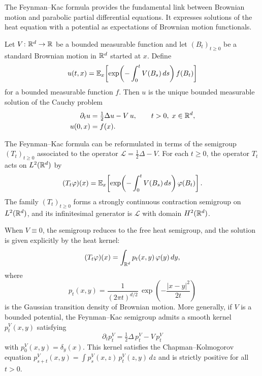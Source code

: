 The Feynman--Kac formula provides the fundamental link between Brownian motion and parabolic partial differential equations. It expresses solutions of the heat equation with a potential as expectations of Brownian motion functionals.

\begin{theorem}
Let $V \colon \mathbb{R}^d \to \mathbb{R}$ be a bounded measurable function and let $(B_t)_{t \geq 0}$ be a standard Brownian motion in $\mathbb{R}^d$ started at $x$. Define
\[
    u(t,x) = \operatorname{\mathbb{E}}_x\!\left[\exp\!\left(-\int_0^t V(B_s)\,ds\right) f(B_t)\right]
\]
for a bounded measurable function $f$. Then $u$ is the unique bounded measurable solution of the Cauchy problem
\begin{align}
    \partial_t u &= \tfrac{1}{2}\Delta u - V\, u, \qquad t > 0,\; x \in \mathbb{R}^d, \label{eq:feynman-kac-pde}\\
    u(0,x) &= f(x). \label{eq:feynman-kac-ic}
\end{align}
\end{theorem}

\begin{remark}
The Feynman--Kac formula can be reformulated in terms of the semigroup $(T_t)_{t \geq 0}$ associated to the operator $\mathcal{L} = \frac{1}{2}\Delta - V$. For each $t \geq 0$, the operator $T_t$ acts on $L^2(\mathbb{R}^d)$ by
\[
    (T_t \varphi)(x) = \operatorname{\mathbb{E}}_x\!\left[\exp\!\left(-\int_0^t V(B_s)\,ds\right) \varphi(B_t)\right].
\]
The family $(T_t)_{t \geq 0}$ forms a strongly continuous contraction semigroup on $L^2(\mathbb{R}^d)$, and its infinitesimal generator is $\mathcal{L}$ with domain $H^2(\mathbb{R}^d)$.
\end{remark}

\begin{remark}
When $V \equiv 0$, the semigroup reduces to the free heat semigroup, and the solution is given explicitly by the heat kernel:
\[
    (T_t \varphi)(x) = \int_{\mathbb{R}^d} p_t(x,y)\,\varphi(y)\,dy,
\]
where
\[
    p_t(x,y) = \frac{1}{(2\pi t)^{d/2}}\,\exp\!\left(-\frac{|x-y|^2}{2t}\right)
\]
is the Gaussian transition density of Brownian motion. More generally, if $V$ is a bounded potential, the Feynman--Kac semigroup admits a smooth kernel $p_t^V(x,y)$ satisfying
\[
    \partial_t p_t^V = \tfrac{1}{2}\Delta\, p_t^V - V\, p_t^V
\]
with $p_0^V(x,y) = \delta_y(x)$. This kernel satisfies the Chapman--Kolmogorov equation $p_{s+t}^V(x,y) = \int p_s^V(x,z)\,p_t^V(z,y)\,dz$ and is strictly positive for all $t > 0$.
\end{remark}

